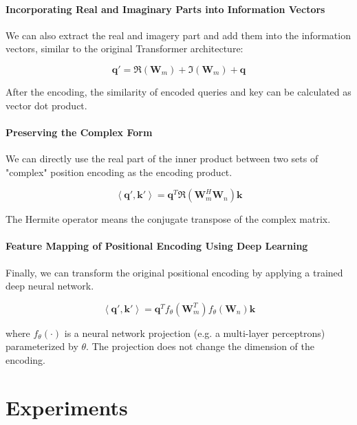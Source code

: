\documentclass[letterpaper]{article} %
\begin{document}
\paragraph{Incorporating Real and Imaginary Parts into Information Vectors} We can also extract the real and imagery part and add them into the information vectors, similar to the original Transformer architecture:

\begin{equation}
\boldsymbol{q}' = \Re\left(\boldsymbol{W}_m\right) + \Im\left(\boldsymbol{W}_m\right) + \boldsymbol{q}
\end{equation}

After the encoding, the similarity of encoded queries and key can be calculated as vector dot product.

\paragraph{Preserving the Complex Form} We can directly use the real part of the inner product between two sets of "complex" position encoding as the encoding product.

\begin{equation}
\left\langle \boldsymbol{q}', \boldsymbol{k}' \right\rangle = \boldsymbol{q}^T \Re\left(\boldsymbol{W}_m^H \boldsymbol{W}_n\right) \boldsymbol{k}
\end{equation}

The Hermite operator means the conjugate transpose of the complex matrix.

\paragraph{Feature Mapping of Positional Encoding Using Deep Learning} Finally, we can transform the original positional encoding by applying a trained deep neural network.

\begin{equation}
\left\langle \boldsymbol{q}', \boldsymbol{k}' \right\rangle = \boldsymbol{q}^T f_\theta(\boldsymbol{W}_m^T) f_\theta(\boldsymbol{W}_n) \boldsymbol{k}
\end{equation}

where $f_\theta(\cdot)$ is a neural network projection (e.g. a multi-layer perceptrons) parameterized by $\theta$. The projection does not change the dimension of the encoding.

\section{Experiments}
\end{document}
